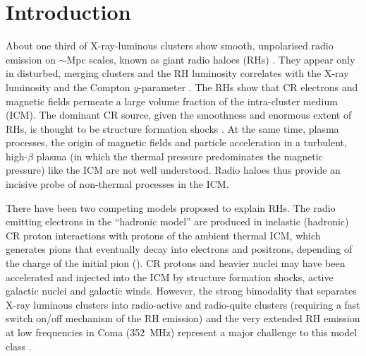 \documentclass[fleqn,usenatbib,useAMS]{mnras}
\begin{document}


\section{Introduction}
About one third of X-ray-luminous clusters show smooth, unpolarised radio
emission on $\sim$Mpc scales, known as giant radio haloes (RHs)
\citep{2014IJMPD..2330007B}. They appear only in disturbed, merging clusters and
the RH luminosity correlates with the X-ray luminosity
\citep{2001A&A...369..441G,2012A&ARv..20...54F} and the Compton $y$-parameter
\citep{2012MNRAS.421L.112B,2013A&A...554A.140P}. The RHs show that CR electrons
and magnetic fields permeate a large volume fraction of the intra-cluster medium
(ICM). The dominant CR source, given the smoothness and enormous extent of RHs,
is thought to be structure formation shocks \citep{miniati01,pfrommer08}. At the
same time, plasma processes, the origin of magnetic fields and particle
acceleration in a turbulent, high-$\beta$ plasma (in which the thermal pressure
predominates the magnetic pressure) like the ICM are not well understood. Radio
haloes thus provide an incisive probe of non-thermal processes in the ICM.

There have been two competing models proposed to explain RHs.  The
radio emitting electrons in the ``hadronic model'' are produced in
inelastic (hadronic) CR proton interactions with protons of the
ambient thermal ICM, which generates pions that eventually decay into
electrons and positrons, depending of the charge of the initial pion
(\citealp{1980ApJ...239L..93D,1999APh....12..169B,2001ApJ...562..233M,
  2004A&A...413...17P,2008MNRAS.385.1211P,ensslin11}). CR protons and
heavier nuclei may have been accelerated and injected into the ICM by
structure formation shocks, active galactic nuclei and galactic
winds. However, the strong bimodality that separates X-ray luminous
clusters into radio-active and radio-quite clusters (requiring a
fast switch on/off mechanism of the RH emission) and the very extended
RH emission at low frequencies in Coma (352~MHz) represent a major
challenge to this model class \citep{brunetti12,2014MNRAS.438..124Z}.
\end{document}
